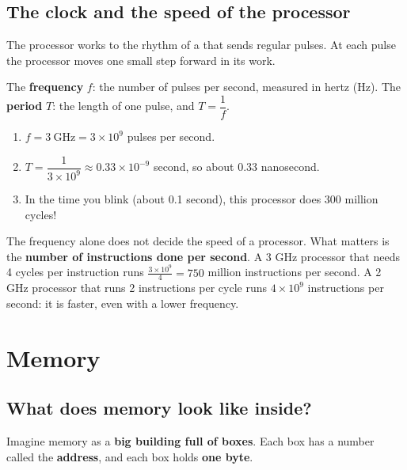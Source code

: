 \subsection{The clock and the speed of the processor}
The processor works to the rhythm of a  that sends regular pulses. At each pulse the
processor moves one small step forward in its work.

\begin{tarif}
    The \textbf{frequency} $f$: the number of pulses per second, measured in hertz (Hz).
    The \textbf{period} $T$: the length of one pulse, and $T = \dfrac{1}{f}$.
\end{tarif}

\begin{khatwa}
    \begin{enumerate}
        \item $f = 3\ \text{GHz} = 3 \times 10^{9}$ pulses per second.
        \item $T = \dfrac{1}{3 \times 10^{9}} \approx 0.33 \times 10^{-9}$ second, so about 0.33 nanosecond.
        \item In the time you blink (about 0.1 second), this processor does 300 million cycles!
    \end{enumerate}
\end{khatwa}

\begin{intabih}
    The frequency alone does not decide the speed of a processor. What matters is the \textbf{number of
    instructions done per second}. A 3 GHz processor that needs 4 cycles per instruction runs
    $\frac{3 \times 10^9}{4} = 750$ million instructions per second. A 2 GHz processor that runs 2 instructions
    per cycle runs $4 \times 10^9$ instructions per second: it is faster, even with a lower frequency.
\end{intabih}

\section{Memory}

\subsection{What does memory look like inside?}
Imagine memory as a \textbf{big building full of boxes}. Each box has a number called the
\textbf{address}, and each box holds \textbf{one byte}.

